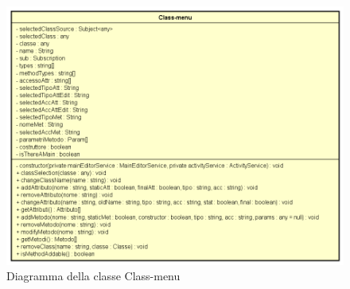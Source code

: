 \begin{figure}[h!]
	\centering
	\includegraphics[scale=0.8]{res/sections/SpecificaFrontEnd/Services/Disegnetti/class-menu.png}
	\caption{Diagramma della classe Class-menu}
\end{figure}

